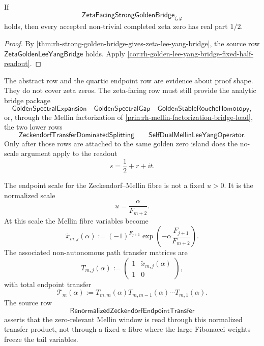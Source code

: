 \begin{theorem}
\label{thm:rh-strong-golden-bridge-fixed-half-readout}
If
$$
\mathsf{ZetaFacingStrongGoldenBridge}_{\zeta,\varphi}
$$
holds, then every accepted non-trivial completed zeta zero has real part
$1/2$.
\end{theorem}

\begin{proof}
By
\autoref{thm:rh-strong-golden-bridge-gives-zeta-lee-yang-bridge}, the
source row $\mathsf{ZetaGoldenLeeYangBridge}$ holds.  Apply
\autoref{cor:rh-golden-lee-yang-bridge-fixed-half-readout}.
\end{proof}

\begin{principle}
\label{prin:rh-three-level-proof-boundary}
The abstract row and the quartic endpoint row are evidence about proof
shape.  They do not cover zeta zeros.  The zeta-facing row must still
provide the analytic bridge package
$$
\mathsf{GoldenSpectralExpansion}
\quad
\mathsf{GoldenSpectralGap}
\quad
\mathsf{GoldenStableRoucheHomotopy},
$$
or, through the Mellin factorization of
\autoref{prin:rh-mellin-factorization-bridge-load}, the two lower rows
$$
\mathsf{ZeckendorfTransferDominatedSplitting}
\qquad
\mathsf{SelfDualMellinLeeYangOperator}.
$$
Only after those rows are attached to the same golden zero island does
the no-scale argument apply to the readout
$$
s=\frac12+r+it.
$$
\end{principle}

\begin{definition}
\label{def:rh-renormalized-zeckendorf-endpoint-transfer}
The endpoint scale for the Zeckendorf--Mellin fibre is not a fixed
$u>0$.  It is the normalized scale
$$
u=\frac{\alpha}{F_{m+2}}.
$$
At this scale the Mellin fibre variables become
$$
\widetilde x_{m,j}(\alpha)
:=
(-1)^{F_{j+1}}
\exp\left(-\alpha\frac{F_{j+1}}{F_{m+2}}\right).
$$
The associated non-autonomous path transfer matrices are
$$
T_{m,j}(\alpha)
:=
\begin{pmatrix}
1&\widetilde x_{m,j}(\alpha)\\
1&0
\end{pmatrix},
$$
with total endpoint transfer
$$
\mathcal T_m(\alpha)
:=
T_{m,m}(\alpha)T_{m,m-1}(\alpha)\cdots T_{m,1}(\alpha).
$$
The source row
$$
\mathsf{RenormalizedZeckendorfEndpointTransfer}
$$
asserts that the zero-relevant Mellin window is read through this
normalized transfer product, not through a fixed-$u$ fibre where the
large Fibonacci weights freeze the tail variables.
\end{definition}

